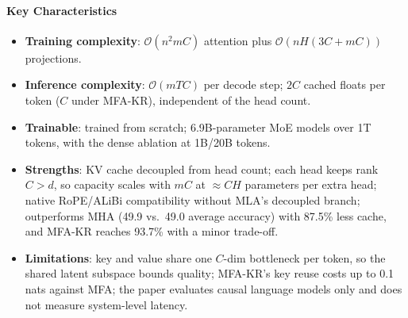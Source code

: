 \paragraph{Key Characteristics}
\begin{itemize}[leftmargin=*]
    \item \textbf{Training complexity}: $\mathcal{O}(n^{2}mC)$ attention plus $\mathcal{O}(nH(3C+mC))$ projections.
    \item \textbf{Inference complexity}: $\mathcal{O}(mTC)$ per decode step; $2C$ cached floats per token ($C$ under MFA-KR), independent of the head count.
    \item \textbf{Trainable}: trained from scratch; 6.9B-parameter MoE models over 1T tokens, with the dense ablation at 1B/20B tokens.
    \item \textbf{Strengths}: KV cache decoupled from head count; each head keeps rank $C>d$, so capacity scales with $mC$ at $\approx CH$ parameters per extra head; native RoPE/ALiBi compatibility without MLA's decoupled branch; outperforms MHA (49.9 vs.\ 49.0 average accuracy) with 87.5\% less cache, and MFA-KR reaches 93.7\% with a minor trade-off.
    \item \textbf{Limitations}: key and value share one $C$-dim bottleneck per token, so the shared latent subspace bounds quality; MFA-KR's key reuse costs up to 0.1 nats against MFA; the paper evaluates causal language models only and does not measure system-level latency.
\end{itemize}
